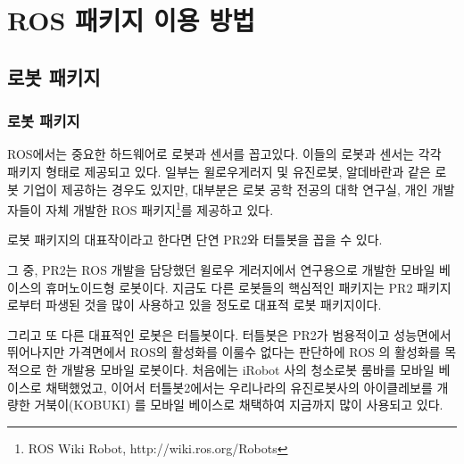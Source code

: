 
\chapter{ROS 패키지 이용 방법}

\section{로봇 패키지}

\subsection{로봇 패키지}

ROS에서는 중요한 하드웨어로 로봇과 센서를 꼽고있다. 이들의 로봇과 센서는 각각 패키지 형태로 제공되고 있다. 일부는 윌로우게러지 및 유진로봇, 알데바란과 같은 로봇 기업이 제공하는 경우도 있지만, 대부분은  로봇 공학 전공의 대학 연구실, 개인 개발자들이 자체 개발한 ROS 패키지\footnote{ROS Wiki Robot, http://wiki.ros.org/Robots}를 제공하고 있다. 

로봇 패키지의 대표작이라고 한다면 단연 PR2와 터틀봇을 꼽을 수 있다. 

그 중, PR2는 ROS 개발을 담당했던 윌로우 게러지에서 연구용으로 개발한 모바일 베이스의 휴머노이드형 로봇이다. 지금도 다른 로봇들의 핵심적인 패키지는 PR2 패키지로부터 파생된 것을 많이 사용하고 있을 정도로 대표적 로봇 패키지이다. 

그리고 또 다른 대표적인 로봇은 터틀봇이다. 터틀봇은 PR2가 범용적이고 성능면에서 뛰어나지만 가격면에서 ROS의 활성화를 이룰수 없다는 판단하에 ROS 의 활성화를 목적으로 한 개발용 모바일 로봇이다. 처음에는 iRobot 사의 청소로봇 룸바를 모바일 베이스로 채택했었고, 이어서 터틀봇2에서는 우리나라의 유진로봇사의 아이클레보를 개량한 거북이(KOBUKI) 를 모바일 베이스로 채택하여 지금까지 많이 사용되고 있다.

